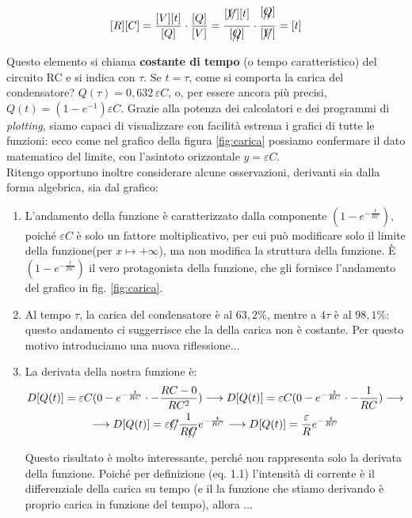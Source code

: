 \documentclass[a3paper, twoside, openany]{book}
\theoremstyle{definition}
\begin{document}
$$[R][C]=\frac{[V][t]}{[Q]}\cdot\frac{[Q]}{[V]}=\frac{[\xout{V}][t]}{[\xout{Q}]} \cdot \frac{[\xout{Q}]}{[\xout{V}]}=[t]$$ Questo elemento si chiama \textbf{costante di tempo} (o tempo caratteristico) del circuito RC e si indica con $\tau$. Se $t=\tau$, come si comporta la carica del condensatore? $Q(\tau)=0,632\,\varepsilon C$, o, per essere ancora più precisi, $Q(t)=\left(1-e^{-1}\right) \varepsilon C$. Grazie alla potenza dei calcolatori e dei programmi di \emph{plotting}, siamo capaci di visualizzare con facilità estrema i grafici di tutte le funzioni: ecco come nel grafico della figura \ref{fig:carica} possiamo confermare il dato matematico del limite, con l'asintoto orizzontale $y=\varepsilon C$. \\ Ritengo opportuno inoltre considerare alcune osservazioni, derivanti sia dalla forma algebrica, sia dal grafico: \begin{enumerate}
\item L'andamento della funzione è caratterizzato dalla componente $(1-e^{-\frac{t}{RC}})$, poiché $\varepsilon C$ è solo un fattore moltiplicativo, per cui può modificare solo il limite della funzione(per $x\mapsto +\infty$), ma non modifica la struttura della funzione. È $(1-e^{-\frac{t}{RC}})$ il vero protagonista della funzione, che gli fornisce l'andamento del grafico in fig. \ref{fig:carica}.
\item Al tempo $\tau$, la carica del condensatore è al $63,2\%$, mentre a $4\tau$ è al $98,1\%$: questo andamento ci suggerrisce che la  della carica non è costante. Per questo motivo introduciamo una nuova riflessione...
\item La derivata della nostra funzione è: \begin{multline*}D[Q(t)]=\varepsilon C (0-e^{-\frac{t}{RC}}\cdot-\frac{RC-0}{RC^2})\longrightarrow D[Q(t)]=\varepsilon C (0-e^{-\frac{t}{RC}}\cdot-\frac{1}{RC})\longrightarrow\\\longrightarrow D[Q(t)]=\varepsilon \xout{C}\frac{1}{R\xout{C}} e^{-\frac{t}{RC}}\longrightarrow D[Q(t)]=\frac{\varepsilon}{R} e^{-\frac{t}{RC}}\end{multline*} Questo risultato è molto interessante, perché non rappresenta solo la derivata della funzione. Poiché per definizione (eq. 1.1) l'intensità di corrente è il differenziale della carica su tempo (e il la funzione che stiamo derivando è proprio carica in funzione del tempo), allora ...

\end{enumerate}
\end{document}
